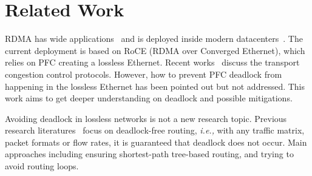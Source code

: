\section{Related Work}

 RDMA has wide applications~\cite{farm} and is deployed inside 
modern datacenters~\cite{timely,dcqcn,rdmascale}. The current deployment is based on
RoCE (RDMA over Converged Ethernet), which relies on PFC creating a lossless Ethernet.
Recent works~\cite{timely,dcqcn} discuss the transport congestion control protocols. However,
how to prevent PFC deadlock from happening in the lossless Ethernet has been pointed out 
but not addressed. This work aims to get deeper understanding on deadlock and possible mitigations.

 Avoiding deadlock in lossless networks is not a new research 
topic. Previous research literatures~\cite{tcpbolt,karol2003prevention} focus on deadlock-free routing, 
{\em i.e.,} with any traffic matrix, packet formats or flow rates, it is guaranteed that deadlock 
does not occur. Main approaches including ensuring shortest-path tree-based routing, and 
trying to avoid routing loops. 




